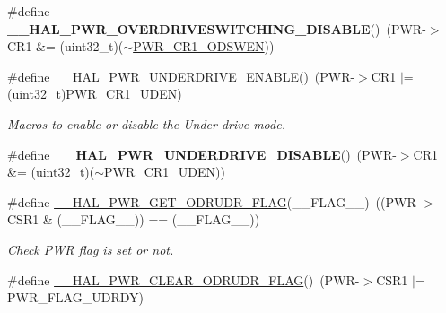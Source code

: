 \begin{DoxyCompactItemize}
\mbox{\label{group___p_w_r_ex___exported___macro_gaadf09628cdf4a7c430a53eb850d42d70}} 
\#define {\bfseries \+\_\+\+\_\+\+H\+A\+L\+\_\+\+P\+W\+R\+\_\+\+O\+V\+E\+R\+D\+R\+I\+V\+E\+S\+W\+I\+T\+C\+H\+I\+N\+G\+\_\+\+D\+I\+S\+A\+B\+LE}()~(P\+WR-\/$>$C\+R1 \&= (uint32\+\_\+t)($\sim$\mbox{\hyperlink{group___peripheral___registers___bits___definition_ga570acaf0a109bf1678acb3eebd7aa84b}{P\+W\+R\+\_\+\+C\+R1\+\_\+\+O\+D\+S\+W\+EN}}))
\item 
\#define \mbox{\hyperlink{group___p_w_r_ex___exported___macro_gafbaac4011a44566b0ba2a563736cca09}{\+\_\+\+\_\+\+H\+A\+L\+\_\+\+P\+W\+R\+\_\+\+U\+N\+D\+E\+R\+D\+R\+I\+V\+E\+\_\+\+E\+N\+A\+B\+LE}}()~(P\+WR-\/$>$C\+R1 $\vert$= (uint32\+\_\+t)\mbox{\hyperlink{group___peripheral___registers___bits___definition_gae462863ec79bc72219fc3e0c3180b39a}{P\+W\+R\+\_\+\+C\+R1\+\_\+\+U\+D\+EN}})
\begin{DoxyCompactList}\small\item\em Macros to enable or disable the Under drive mode. \end{DoxyCompactList}\item 
\mbox{\label{group___p_w_r_ex___exported___macro_ga207c042d72bfea9979134c54c4f81275}} 
\#define {\bfseries \+\_\+\+\_\+\+H\+A\+L\+\_\+\+P\+W\+R\+\_\+\+U\+N\+D\+E\+R\+D\+R\+I\+V\+E\+\_\+\+D\+I\+S\+A\+B\+LE}()~(P\+WR-\/$>$C\+R1 \&= (uint32\+\_\+t)($\sim$\mbox{\hyperlink{group___peripheral___registers___bits___definition_gae462863ec79bc72219fc3e0c3180b39a}{P\+W\+R\+\_\+\+C\+R1\+\_\+\+U\+D\+EN}}))
\item 
\#define \mbox{\hyperlink{group___p_w_r_ex___exported___macro_ga846a66516ac8a6212f414f3d801169f9}{\+\_\+\+\_\+\+H\+A\+L\+\_\+\+P\+W\+R\+\_\+\+G\+E\+T\+\_\+\+O\+D\+R\+U\+D\+R\+\_\+\+F\+L\+AG}}(\+\_\+\+\_\+\+F\+L\+A\+G\+\_\+\+\_\+)~((P\+WR-\/$>$C\+S\+R1 \& (\+\_\+\+\_\+\+F\+L\+A\+G\+\_\+\+\_\+)) == (\+\_\+\+\_\+\+F\+L\+A\+G\+\_\+\+\_\+))
\begin{DoxyCompactList}\small\item\em Check P\+WR flag is set or not. \end{DoxyCompactList}\item 
\mbox{\label{group___p_w_r_ex___exported___macro_ga474f22f28c87cc54df405d83852fcac1}} 
\#define \mbox{\hyperlink{group___p_w_r_ex___exported___macro_ga474f22f28c87cc54df405d83852fcac1}{\+\_\+\+\_\+\+H\+A\+L\+\_\+\+P\+W\+R\+\_\+\+C\+L\+E\+A\+R\+\_\+\+O\+D\+R\+U\+D\+R\+\_\+\+F\+L\+AG}}()~(P\+WR-\/$>$C\+S\+R1 $\vert$= P\+W\+R\+\_\+\+F\+L\+A\+G\+\_\+\+U\+D\+R\+DY)

\end{DoxyCompactItemize}
